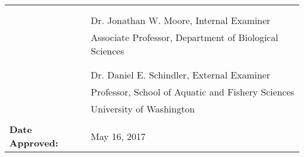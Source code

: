 \begin{tabular}{ l p{94mm} }
    & \\

    & \\ \cline{2-2}
    & Dr. Jonathan W. Moore, Internal Examiner \\
    & Associate Professor, Department of Biological Sciences \\

    & \\

    & \\ \cline{2-2}
    & Dr. Daniel E. Schindler, External Examiner \\
    & Professor, School of Aquatic and Fishery Sciences \\
    & University of Washington \\

    & \\
  \textbf{Date Approved:}  & May 16, 2017
\end{tabular}


